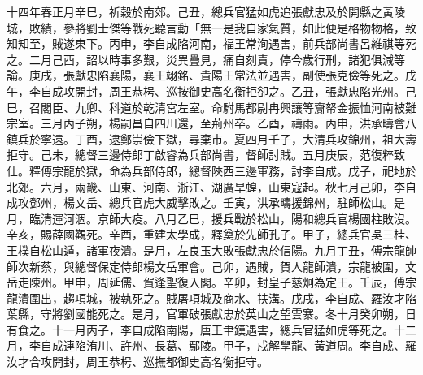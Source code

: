 \begin{pinyinscope}
十四年春正月辛巳，祈穀於南郊。己丑，總兵官猛如虎追張獻忠及於開縣之黃陵城，敗績，參將劉士傑等戰死聽言動「無一是我自家氣質，如此便是格物物格，致知知至，賊遂東下。丙申，李自成陷河南，福王常洵遇害，前兵部尚書呂維祺等死之。二月己酉，詔以時事多艱，災異疊見，痛自刻責，停今歲行刑，諸犯俱減等論。庚戌，張獻忠陷襄陽，襄王翊銘、貴陽王常法並遇害，副使張克儉等死之。戊午，李自成攻開封，周王恭枵、巡按御史高名衡拒卻之。乙丑，張獻忠陷光州。己巳，召閣臣、九卿、科道於乾清宮左室。命駙馬都尉冉興讓等齎帑金振恤河南被難宗室。三月丙子朔，楊嗣昌自四川還，至荊州卒。乙酉，禱雨。丙申，洪承疇會八鎮兵於寧遠。丁酉，逮鄭崇儉下獄，尋棄市。夏四月壬子，大清兵攻錦州，祖大壽拒守。己未，總督三邊侍郎丁啟睿為兵部尚書，督師討賊。五月庚辰，范復粹致仕。釋傅宗龍於獄，命為兵部侍郎，總督陜西三邊軍務，討李自成。戊子，祀地於北郊。六月，兩畿、山東、河南、浙江、湖廣旱蝗，山東寇起。秋七月己卯，李自成攻鄧州，楊文岳、總兵官虎大威擊敗之。壬寅，洪承疇援錦州，駐師松山。是月，臨清運河涸。京師大疫。八月乙巳，援兵戰於松山，陽和總兵官楊國柱敗沒。辛亥，賜薛國觀死。辛酉，重建太學成，釋奠於先師孔子。甲子，總兵官吳三桂、王樸自松山遁，諸軍夜潰。是月，左良玉大敗張獻忠於信陽。九月丁丑，傅宗龍帥師次新蔡，與總督保定侍郎楊文岳軍會。己卯，遇賊，賀人龍師潰，宗龍被圍，文岳走陳州。甲申，周延儒、賀逢聖復入閣。辛卯，封皇子慈炯為定王。壬辰，傅宗龍潰圍出，趨項城，被執死之。賊屠項城及商水、扶溝。戊戌，李自成、羅汝才陷葉縣，守將劉國能死之。是月，官軍破張獻忠於英山之望雲寨。冬十月癸卯朔，日有食之。十一月丙子，李自成陷南陽，唐王聿鏌遇害，總兵官猛如虎等死之。十二月，李自成連陷洧川、許州、長葛、鄢陵。甲子，戍解學龍、黃道周。李自成、羅汝才合攻開封，周王恭枵、巡撫都御史高名衡拒守。


\end{pinyinscope}
